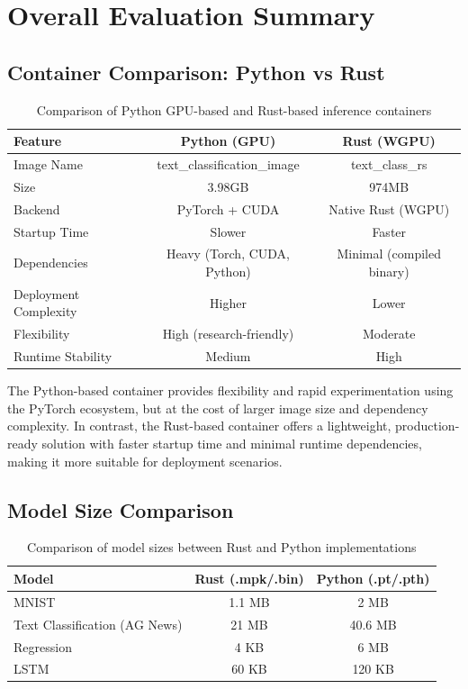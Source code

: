 \documentclass{ieeeaccess}
\begin{document}
\section{Overall Evaluation Summary}

\subsection{Container Comparison: Python vs Rust}

\begin{table}[t!]
\centering
\begin{tabular}{|l|c|c|}
\hline
\textbf{Feature} & \textbf{Python (GPU)} & \textbf{Rust (WGPU)} \\
\hline
Image Name & text\_classification\_image & text\_class\_rs \\
\hline
Size &  3.98GB &  974MB \\
\hline
Backend & PyTorch + CUDA & Native Rust (WGPU) \\
\hline
Startup Time & Slower & Faster \\
\hline
Dependencies & Heavy (Torch, CUDA, Python) & Minimal (compiled binary) \\
\hline
Deployment Complexity & Higher & Lower \\
\hline
Flexibility & High (research-friendly) & Moderate \\
\hline
Runtime Stability & Medium & High \\
\hline
\end{tabular}
\caption{Comparison of Python GPU-based and Rust-based inference containers}
\end{table}

\noindent
The Python-based container provides flexibility and rapid experimentation using the PyTorch ecosystem, but at the cost of larger image size and dependency complexity. In contrast, the Rust-based container offers a lightweight, production-ready solution with faster startup time and minimal runtime dependencies, making it more suitable for deployment scenarios.


\subsection{Model Size Comparison}
 
\begin{table}[t!]
\centering
\begin{tabular}{|l|c|c|}
\hline
\textbf{Model} & \textbf{Rust (.mpk/.bin)} & \textbf{Python (.pt/.pth)} \\
\hline
MNIST & 1.1 MB & 2 MB \\
\hline
Text Classification (AG News) & 21 MB & 40.6 MB \\
\hline
Regression & 4 KB & 6 MB \\
\hline
LSTM & 60 KB & 120 KB \\
\hline
\end{tabular}
\caption{Comparison of model sizes between Rust and Python implementations}
\end{table}
\end{document}
